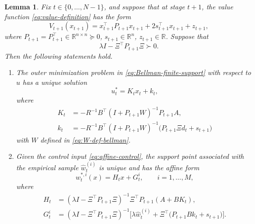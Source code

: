 \documentclass[10pt,journal,twoside]{IEEEtran}
\newtheorem{lemma}{Lemma}
\theoremstyle{definition}
\theoremstyle{remark}
\newcommand{\R}{\mathbb{R}}
\begin{document}
\begin{lemma}
	\label{lem:one-step-affine-minimax}
Fix \(t\in\{0,\ldots,N-1\}\), and suppose that at stage $t+1$, the value function \eqref{eq:value-definition} has the form
	\begin{equation}
		V_{t+1}(x_{t+1})
		=
		x_{t+1}^\top P_{t+1}x_{t+1}
		+2s_{t+1}^\top x_{t+1}
		+z_{t+1},
		\label{eq:one-step-continuation}
	\end{equation}
	where \(P_{t+1}=P_{t+1}^\top\in \R^{n\times n}\succeq0\), $s_{t+1}\in\R^n$, $z_{t+1}\in\R$.  Suppose that
	\begin{equation}
		\lambda I-\Xi^\top P_{t+1}\Xi\succ0.
		\label{eq:one-step-admissibility}
	\end{equation}
	Then the following statements hold.
	
	\begin{enumerate}
		\item The outer minimization problem in
		\eqref{eq:Bellman-finite-support} with respect to \(u\) has a
		unique solution
		\begin{equation}
			u_t^*=K_tx_t+k_t,
			\label{eq:affine-control}
		\end{equation}
		where
		\begin{align}
			K_t
			&=
			-R^{-1}B^\top
			(I+P_{t+1}W)^{-1}
			P_{t+1}A,
			\label{eq:K-affine}\\
			k_t
			&=
			-R^{-1}\!B^\top\!
			(I+P_{t+1}W)^{-1}\!
			\big(P_{t+1}\Xi d_t+s_{t+1}\big)
			\label{eq:k-affine}
		\end{align}
        with $W$ defined in \eqref{eq:W-def-bellman}.
	\item Given the control input \eqref{eq:affine-control}, the support
		point associated with the empirical sample \(\widehat w_t^{(i)}\)
		is unique and has the affine form
		\begin{equation}
			w_t^{*,i}(x)=H_tx+G_t^i,
			\qquad i=1,\ldots,M,
			\label{eq:wstar-affine-state}
		\end{equation}
		where
        \begin{equation}
		\begin{aligned}
			H_t
			&=
			(\lambda I-\Xi^\top P_{t+1}\Xi)^{-1}
			\Xi^\top P_{t+1}(A+BK_t),
			\\
			G_t^i
			&=\!
			(\lambda I\!-\!\Xi^\top\! P_{t+1}\Xi)^{-1}\!
			\Big[
			\lambda\widehat w_t^{(i)}\!+\Xi^\top\!\big(P_{t+1}Bk_t\!+\!s_{t+1}\big)
			\Big].
			\label{eq:G-affine}
		\end{aligned}
        \end{equation}
	\end{enumerate}
\end{lemma}
\end{document}
